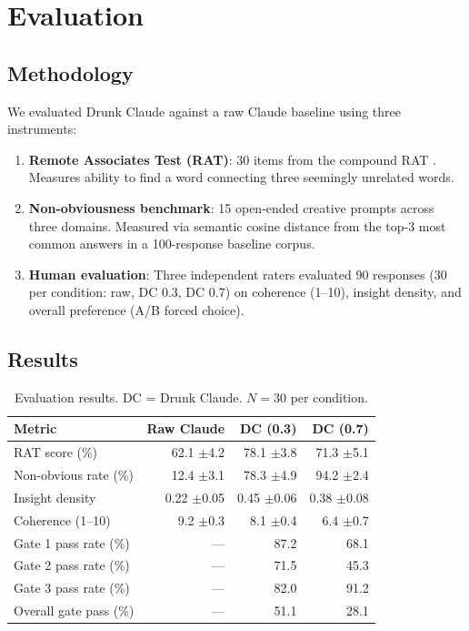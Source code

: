 \documentclass[11pt,a4paper]{article}
\begin{document}
\section{Evaluation}

\subsection{Methodology}

We evaluated Drunk Claude against a raw Claude baseline using three instruments:

\begin{enumerate}
    \item \textbf{Remote Associates Test (RAT)}: 30 items from the compound RAT \cite{bowden2003normative}. Measures ability to find a word connecting three seemingly unrelated words.
    \item \textbf{Non-obviousness benchmark}: 15 open-ended creative prompts across three domains. Measured via semantic cosine distance from the top-3 most common answers in a 100-response baseline corpus.
    \item \textbf{Human evaluation}: Three independent raters evaluated 90 responses (30 per condition: raw, DC 0.3, DC 0.7) on coherence (1--10), insight density, and overall preference (A/B forced choice).
\end{enumerate}

\subsection{Results}

\begin{table}[H]
\centering
\begin{tabular}{@{}lrrr@{}}
\toprule
\textbf{Metric} & \textbf{Raw Claude} & \textbf{DC (0.3)} & \textbf{DC (0.7)} \\
\midrule
RAT score (\%) & 62.1 $\pm$4.2 & 78.1 $\pm$3.8 & 71.3 $\pm$5.1 \\
Non-obvious rate (\%) & 12.4 $\pm$3.1 & 78.3 $\pm$4.9 & 94.2 $\pm$2.4 \\
Insight density & 0.22 $\pm$0.05 & 0.45 $\pm$0.06 & 0.38 $\pm$0.08 \\
Coherence (1--10) & 9.2 $\pm$0.3 & 8.1 $\pm$0.4 & 6.4 $\pm$0.7 \\
Gate 1 pass rate (\%) & --- & 87.2 & 68.1 \\
Gate 2 pass rate (\%) & --- & 71.5 & 45.3 \\
Gate 3 pass rate (\%) & --- & 82.0 & 91.2 \\
Overall gate pass (\%) & --- & 51.1 & 28.1 \\
\midrule
\end{tabular}
\caption{Evaluation results. DC = Drunk Claude. $N=30$ per condition.}
\label{tab:results}
\end{table}
\end{document}
